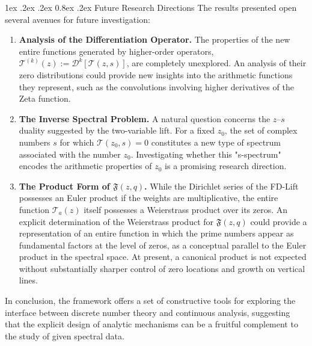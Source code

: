\documentclass[11pt,a4paper]{amsart}
\makeatletter
\renewcommand\paragraph{\@startsection{paragraph}{4}{\z@}%
  {1ex \@plus .2ex \@minus .2ex}%
  {0.8ex \@plus .2ex}%
  {\normalfont\bfseries}}
\theoremstyle{plain}
\theoremstyle{definition}
\theoremstyle{remark}
\makeatother
\begin{document}
\paragraph{Future Research Directions}
The results presented open several avenues for future investigation:
\begin{enumerate}
    \item \textbf{Analysis of the Differentiation Operator.} The properties of the new entire functions generated by higher-order operators, $\mathcal{T}^{(k)}(z) := \mathcal{D}^k[\mathcal{T}(z,s)]$, are completely unexplored. An analysis of their zero distributions could provide new insights into the arithmetic functions they represent, such as the convolutions involving higher derivatives of the Zeta function.

    \item \textbf{The Inverse Spectral Problem.} A natural question concerns the $z$–$s$ duality suggested by the two-variable lift. For a fixed $z_0$, the set of complex numbers $s$ for which $\mathcal{T}(z_0, s) = 0$ constitutes a new type of spectrum associated with the number $z_0$. Investigating whether this "s-spectrum" encodes the arithmetic properties of $z_0$ is a promising research direction.

    \item \textbf{The Product Form of $\mathfrak{F}(z,q)$.} While the Dirichlet series of the FD-Lift possesses an Euler product if the weights are multiplicative, the entire function $\mathcal{T}_a(z)$ itself possesses a Weierstrass product over its zeros. An explicit determination of the Weierstrass product for $\mathfrak{F}(z,q)$ could provide a representation of an entire function in which the prime numbers appear as fundamental factors at the level of zeros, as a conceptual parallel to the Euler product in the spectral space. At present, a canonical product is not expected without substantially sharper control of zero locations and growth on vertical lines.
\end{enumerate}

In conclusion, the framework offers a set of constructive tools for exploring the interface between discrete number theory and continuous analysis, suggesting that the explicit design of analytic mechanisms can be a fruitful complement to the study of given spectral data.





\end{document}
